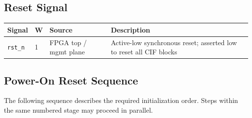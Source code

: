 \subsection{Reset Signal}

\begin{tabularx}{\textwidth}{L{2.5cm} C{0.8cm} L{3cm} X}
\toprule
\textbf{Signal} & \textbf{W} & \textbf{Source} & \textbf{Description} \\
\midrule
\texttt{rst\_n} & 1 & FPGA top / mgmt plane & Active-low synchronous reset; asserted low to reset all CIF blocks \\
\bottomrule
\end{tabularx}

\subsection{Power-On Reset Sequence}

The following sequence describes the required initialization order.
Steps within the same numbered stage may proceed in parallel.

